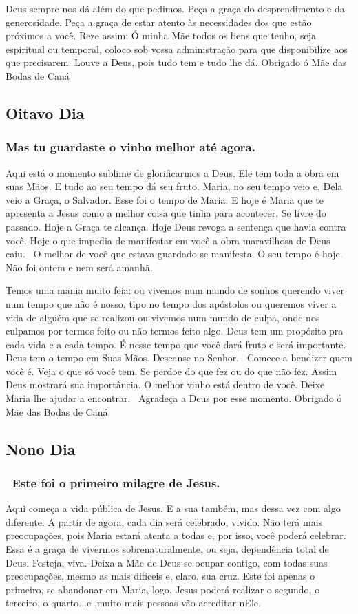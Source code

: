 \documentclass[11pt]{article}
\begin{document}
Deus sempre nos dá além do que pedimos. Peça a graça do desprendimento e da generosidade. Peça a graça de estar atento às necessidades dos que estão próximos a você. Reze assim: Ó minha Mãe todos os bens que tenho, seja espiritual ou temporal, coloco sob vossa administração para que disponibilize aos que precisarem. Louve a Deus, pois tudo tem e tudo lhe dá. Obrigado ó Mãe das Bodas de Caná


\subsection{Oitavo Dia}
\subsubsection*{Mas tu guardaste o vinho melhor até agora.}
Aqui está o momento sublime de glorificarmos a Deus. Ele tem toda a obra em suas Mãos. E tudo ao seu tempo dá seu fruto. Maria, no seu tempo veio e, Dela veio a Graça, o Salvador. Esse foi o tempo de Maria. E hoje é Maria que te apresenta a Jesus como a melhor coisa que tinha para acontecer. Se livre do passado. Hoje a Graça te alcança. Hoje Deus revoga a sentença que havia contra você. Hoje o que impedia de manifestar em você a obra maravilhosa de Deus caiu.  O melhor de você que estava guardado se manifesta. O seu tempo é hoje. Não foi ontem e nem será amanhã.

Temos uma mania muito feia: ou vivemos num mundo de sonhos querendo viver num tempo que não é nosso, tipo no tempo dos apóstolos ou queremos viver a vida de alguém que se realizou ou vivemos num mundo de culpa, onde nos culpamos por termos feito ou não termos feito algo. Deus tem um propósito pra cada vida e a cada tempo. É nesse tempo que você dará fruto e será importante. Deus tem o tempo em Suas Mãos. Descanse no Senhor.  Comece a bendizer quem você é. Veja o que só você tem. Se perdoe do que fez ou do que não fez. Assim Deus mostrará sua importância. O melhor vinho está dentro de você. Deixe Maria lhe ajudar a encontrar.  Agradeça a Deus por esse momento. Obrigado ó Mãe das Bodas de Caná



\subsection{Nono Dia}
\subsubsection*{ Este foi o primeiro milagre de Jesus.}
Aqui começa a vida pública de Jesus. E a sua também, mas dessa vez com algo diferente. A partir de agora, cada dia será celebrado, vivido. Não terá mais preocupações, pois Maria estará atenta a todas e, por isso, você poderá celebrar. Essa é a graça de vivermos sobrenaturalmente, ou seja, dependência total de Deus. Festeja, viva. Deixa a Mãe de Deus se ocupar contigo, com todas suas preocupações, mesmo as mais difíceis e, claro, sua cruz. Este foi apenas o primeiro, se abandonar em Maria, logo, Jesus poderá realizar o segundo, o terceiro, o quarto...e ,muito mais pessoas vão acreditar nEle.
\end{document}
